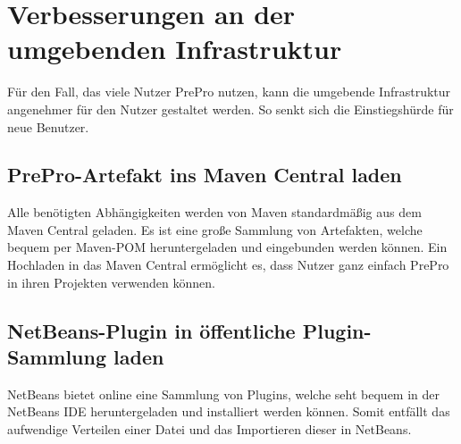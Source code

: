 \section{Verbesserungen an der umgebenden Infrastruktur}
Für den Fall, das viele Nutzer PrePro nutzen, kann die umgebende Infrastruktur angenehmer für den Nutzer gestaltet werden.
So senkt sich die Einstiegshürde für neue Benutzer.

\subsection{PrePro-Artefakt ins Maven Central laden}
Alle benötigten Abhängigkeiten werden von Maven standardmäßig aus dem Maven Central geladen.
Es ist eine große Sammlung von Artefakten, welche bequem per Maven-\ac{POM} heruntergeladen und eingebunden werden können.
Ein Hochladen in das Maven Central ermöglicht es, dass Nutzer ganz einfach PrePro in ihren Projekten verwenden können.

\subsection{NetBeans-Plugin in öffentliche Plugin-Sammlung laden}
NetBeans bietet online eine Sammlung von Plugins, welche seht bequem in der NetBeans IDE heruntergeladen und installiert werden können.
Somit entfällt das aufwendige Verteilen einer Datei und das Importieren dieser in NetBeans.

\endinput
